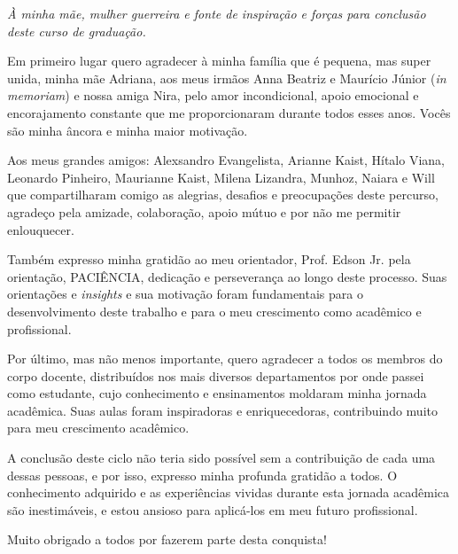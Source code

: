 \documentclass[
	12pt,			%
	openright,		%
	oneside,	
	a4paper,		%
	english,		%
	brazil			%
]{abntex2/abntex2}  %
\begin{document}
	\begin{dedicatoria}
		
		\vspace*{\fill}
		\noindent
		\leftskip=7cm
		\textit{À minha mãe, mulher guerreira e fonte de inspiração e forças para conclusão deste curso de graduação.}
		\vspace{5cm}
	
	\end{dedicatoria}

	\begin{agradecimentos}

		Em primeiro lugar quero agradecer à minha família que é pequena, mas super unida, minha mãe Adriana, aos meus irmãos Anna Beatriz e Maurício Júnior (\textit{in memoriam}) e nossa amiga Nira, pelo amor incondicional, apoio emocional e encorajamento constante que me proporcionaram durante todos esses anos. Vocês são minha âncora e minha maior motivação.
		
		Aos meus grandes amigos: Alexsandro Evangelista, Arianne Kaist, Hítalo Viana, Leonardo Pinheiro, Maurianne Kaist, Milena Lizandra, Munhoz, Naiara e Will que compartilharam comigo as alegrias, desafios e preocupações deste percurso, agradeço pela amizade, colaboração, apoio mútuo e por não me permitir enlouquecer.
		
		Também expresso minha gratidão ao meu orientador, Prof. Edson Jr. pela orientação, PACIÊNCIA, dedicação e perseverança ao longo deste processo. Suas orientações e \textit{insights} e sua motivação foram fundamentais para o desenvolvimento deste trabalho e para o meu crescimento como acadêmico e profissional.
		
		Por último, mas não menos importante, quero agradecer a todos os membros do corpo docente, distribuídos nos mais diversos departamentos por onde passei como estudante, cujo conhecimento e ensinamentos moldaram minha jornada acadêmica. Suas aulas foram inspiradoras e enriquecedoras, contribuindo muito para meu crescimento acadêmico.
		
		A conclusão deste ciclo não teria sido possível sem a contribuição de cada uma dessas pessoas, e por isso, expresso minha profunda gratidão a todos. O conhecimento adquirido e as experiências vividas durante esta jornada acadêmica são inestimáveis, e estou ansioso para aplicá-los em meu futuro profissional.
		
		Muito obrigado a todos por fazerem parte desta conquista!

	\end{agradecimentos}
\end{document}
